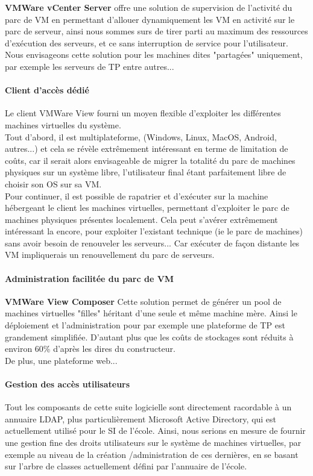 \textbf{VMWare vCenter Server} offre une solution de supervision de l'activité du parc de VM en permettant d'allouer dynamiquement les VM en activité sur le parc de serveur, ainsi nous sommes surs de tirer parti au maximum des ressources d'exécution des serveurs, et ce sans interruption de service pour l'utilisateur. Nous envisageons cette solution pour les machines dites "partagées" uniquement, par exemple les serveurs de TP entre autres...

\paragraph{Client d'accès dédié}
Le client VMWare View fourni un moyen flexible d'exploiter les différentes machines virtuelles du système.\\
Tout d'abord, il est multiplateforme, (Windows, Linux, MacOS, Android, autres...) et cela se révèle extrêmement intéressant en terme de limitation de coûts, car il serait alors envisageable de migrer la totalité du parc de machines physiques  sur un système libre, l'utilisateur final étant parfaitement libre de choisir son OS sur sa VM.\\ 
Pour continuer, il est possible de rapatrier et d'exécuter sur la machine hébergeant le client les machines virtuelles, permettant d'exploiter le parc de machines physiques présentes localement. Cela peut s'avérer extrêmement intéressant la encore, pour exploiter l'existant technique (ie le parc de machines) sans avoir besoin de renouveler les serveurs... Car exécuter de façon distante les VM impliquerais un renouvellement du parc de serveurs.\\

\paragraph{Administration facilitée du parc de VM}
\textbf{VMWare View Composer} Cette solution permet de générer un pool de machines virtuelles "filles" héritant d'une seule et même machine mère. Ainsi le déploiement et l'administration pour par exemple une plateforme de TP est grandement simplifiée. D'autant plus que les coûts de stockages sont réduits à environ 60\% d'après les dires du constructeur.\\
De plus, une plateforme web...%

\paragraph{Gestion des accès utilisateurs}
Tout les composants de cette suite logicielle sont directement racordable à un annuaire LDAP, plus particulièrement Microsoft Active Directory, qui est actuellement utilisé pour le SI de l'école. Ainsi, nous serions en mesure de fournir une gestion fine des droits utilisateurs sur le système de machines virtuelles, par exemple au niveau de la création /administration de ces dernières, en se basant sur l'arbre de classes actuellement défini par l'annuaire de l'école.

